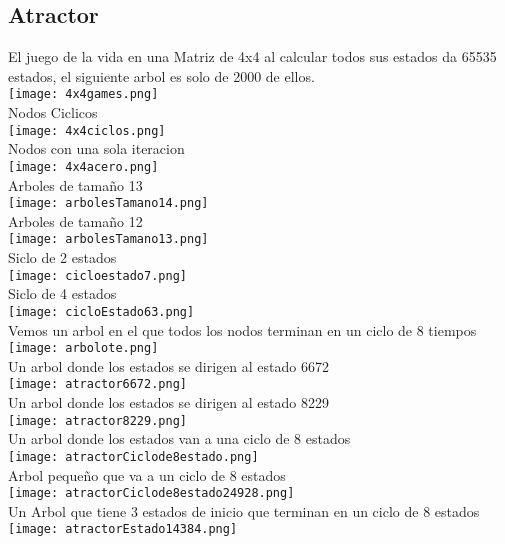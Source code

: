 \documentclass[a4paper,10pt]{article}
\begin{document}
\subsection{Atractor}
El juego de la vida en una Matriz de 4x4 al calcular todos sus estados da 65535 estados, el siguiente arbol es solo de 2000 de ellos.\\
\texttt{[image: 4x4games.png]}
\\Nodos Ciclicos\\
\texttt{[image: 4x4ciclos.png]}
\\Nodos con una sola iteracion\\
\texttt{[image: 4x4acero.png]}
\\Arboles de tamaño 13\\
\texttt{[image: arbolesTamano14.png]}
\\Arboles de tamaño 12\\
\texttt{[image: arbolesTamano13.png]}
\\Siclo de 2 estados\\
\texttt{[image: cicloestado7.png]}
\\Siclo de 4 estados\\
\texttt{[image: cicloEstado63.png]}
\\Vemos un arbol en el que todos los nodos terminan en un ciclo de 8 tiempos\\
\texttt{[image: arbolote.png]}
\\Un arbol donde los estados se dirigen al estado 6672\\
\texttt{[image: atractor6672.png]}
\\Un arbol donde los estados se dirigen al estado 8229\\
\texttt{[image: atractor8229.png]}
\\Un arbol donde los estados van a una ciclo de 8 estados\\
\texttt{[image: atractorCiclode8estado.png]}
\\Arbol pequeño que va a un ciclo de 8 estados\\
\texttt{[image: atractorCiclode8estado24928.png]}
\\Un Arbol que tiene 3 estados de inicio que terminan en un ciclo de 8 estados\\
\texttt{[image: atractorEstado14384.png]}
\end{document}
